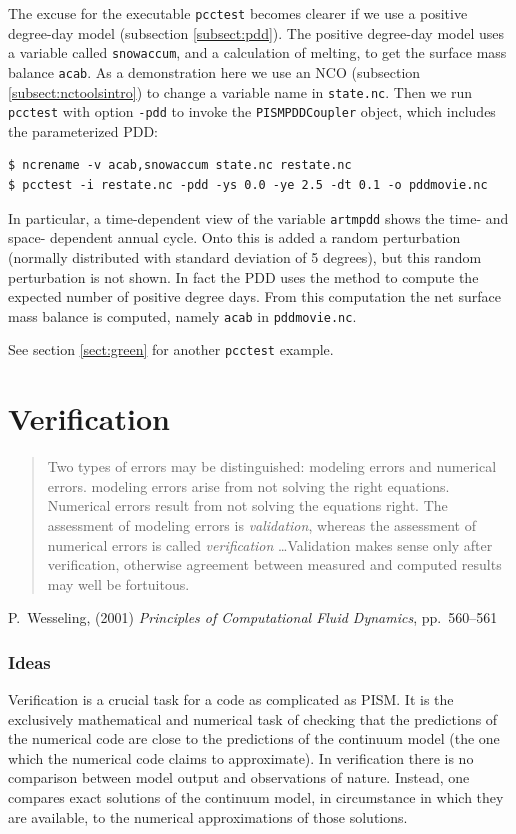 \documentclass[11pt,final]{amsart}
\begin{document}
The excuse for the executable \verb|pcctest| becomes clearer if we use a positive degree-day
model (subsection \ref{subsect:pdd}).  The positive degree-day
model uses a variable called \verb|snowaccum|, and a calculation of melting, to get the
surface mass balance \verb|acab|.  As a demonstration here we use an NCO (subsection 
\ref{subsect:nctoolsintro}) to change a variable name in \verb|state.nc|.  Then we run \verb|pcctest|
with option \verb|-pdd| to invoke the \verb|PISMPDDCoupler|
object, which includes the parameterized PDD:
\begin{verbatim}
$ ncrename -v acab,snowaccum state.nc restate.nc
$ pcctest -i restate.nc -pdd -ys 0.0 -ye 2.5 -dt 0.1 -o pddmovie.nc
\end{verbatim}
In particular, a time-dependent view of the variable \verb|artmpdd| shows the time- and space-
dependent annual cycle.  Onto this is added a random perturbation (normally distributed with standard 
deviation of 5 degrees), but this random perturbation is not shown.  In fact the PDD uses the
\cite{CalovGreve05} method to compute the expected number of positive degree days.  From this
computation the net surface mass balance is computed, namely \verb|acab| in \verb|pddmovie.nc|.

See section \ref{sect:green} for another \verb|pcctest| example.


\clearpage\newpage
\section{Verification}\label{sect:verif}

\bigskip
\begin{quote}  Two types of errors may be distinguished: modeling errors and numerical errors.  modeling errors arise from not solving the right equations.  Numerical errors result from not solving the equations right.  The assessment of modeling errors is \emph{validation}, whereas the assessment of numerical errors is called \emph{verification} \dots  Validation makes sense only after verification, otherwise agreement between measured and computed results may well be fortuitous.
\end{quote}
\hfill P.~Wesseling, (2001)  \emph{Principles of Computational Fluid Dynamics}, pp.~560--561 \cite{Wesseling}
\bigskip

\subsubsection*{Ideas}  Verification is a crucial task for a code as complicated as PISM.  It is the exclusively mathematical and numerical task of checking that the predictions of the numerical code are close to the predictions of the continuum model (the one which the numerical code claims to approximate).  In verification there is no comparison between model output and observations of nature.  Instead, one compares exact solutions of the continuum model, in circumstance in which they are available, to the numerical approximations of those solutions.
\end{document}
